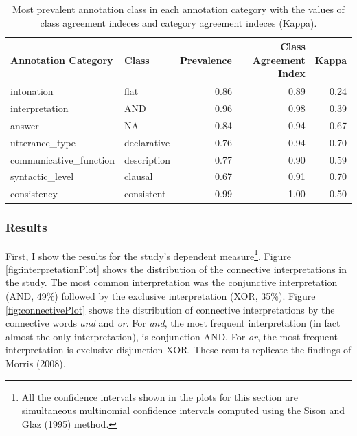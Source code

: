 \documentclass[floatsintext,man]{apa6}
\theoremstyle{definition}
\theoremstyle{definition}
\theoremstyle{definition}
\theoremstyle{remark}
\begin{document}
\begin{table}

\caption{\label{tab:andAgreeStats}Most prevalent annotation class in each annotation category with the values of class agreement indeces and category agreement indeces (Kappa).}
\centering
\begin{tabular}[t]{l|l|r|r|r}
\hline
Annotation Category & Class & Prevalence & Class Agreement Index & Kappa\\
\hline
intonation & flat & 0.86 & 0.89 & 0.24\\
\hline
interpretation & AND & 0.96 & 0.98 & 0.39\\
\hline
answer & NA & 0.84 & 0.94 & 0.67\\
\hline
utterance\_type & declarative & 0.76 & 0.94 & 0.70\\
\hline
communicative\_function & description & 0.77 & 0.90 & 0.59\\
\hline
syntactic\_level & clausal & 0.67 & 0.91 & 0.70\\
\hline
consistency & consistent & 0.99 & 1.00 & 0.50\\
\hline
\end{tabular}
\end{table}

\subsubsection{Results}\label{results}

First, I show the results for the study's dependent measure\footnote{All
  the confidence intervals shown in the plots for this section are
  simultaneous multinomial confidence intervals computed using the Sison
  and Glaz (1995) method.}. Figure \ref{fig:interpretationPlot} shows
the distribution of the connective interpretations in the study. The
most common interpretation was the conjunctive interpretation (AND,
49\%) followed by the exclusive interpretation (XOR, 35\%). Figure
\ref{fig:connectivePlot} shows the distribution of connective
interpretations by the connective words \emph{and} and \emph{or}. For
\emph{and}, the most frequent interpretation (in fact almost the only
interpretation), is conjunction AND. For \emph{or}, the most frequent
interpretation is exclusive disjunction XOR. These results replicate the
findings of Morris (2008).
\end{document}
